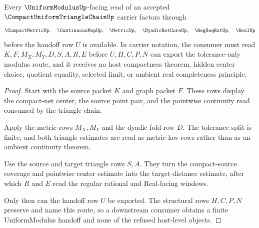 \begin{theorem}
\label{thm:compact-uniform-triangle-chain-uniform-modulus-handoff}
Every $\UniformModulusUp$-facing read of an accepted $\CompactUniformTriangleChainUp$ carrier factors through
$$
\CompactMetricUp,\quad
\ContinuousMapUp,\quad
\MetricUp,\quad
\DyadicRatCoreUp,\quad
\RegSeqRatUp,\quad
\RealUp
$$
before the handoff row $U$ is available. In carrier notation, the consumer must read $K,F,M_X,M_Y,D,S,A,R,E$ before $U,H,C,P,N$ can export the tolerance-only modulus route, and it receives no host compactness theorem, hidden center choice, quotient equality, selected limit, or ambient real completeness principle.
\end{theorem}
\begin{proof}
Start with the source packet $K$ and graph packet $F$. These rows display the compact-net center, the source point pair, and the pointwise continuity read consumed by the triangle chain.

Apply the metric rows $M_X,M_Y$ and the dyadic fold row $D$. The tolerance split is finite, and both triangle estimates are read as metric-law rows rather than as an ambient continuity theorem.

Use the source and target triangle rows $S,A$. They turn the compact-source coverage and pointwise center estimate into the target-distance estimate, after which $R$ and $E$ read the regular rational and Real-facing windows.

Only then can the handoff row $U$ be exported. The structural rows $H,C,P,N$ preserve and name this route, so a downstream consumer obtains a finite UniformModulus handoff and none of the refused host-level objects.
\end{proof}


